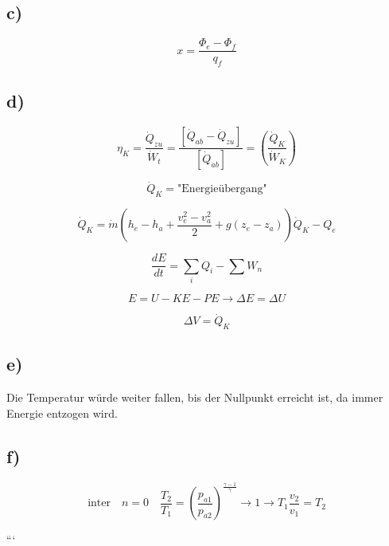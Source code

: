 \subsection*{c)}

\begin{equation*}
    x = \frac{\Phi_e - \Phi_f}{q_f}
\end{equation*}

\subsection*{d)}

\begin{equation*}
    \eta_{K} = \frac{\dot{Q}_{zu}}{\dot{W}_{t}} = \frac{[\dot{Q}_{ab} - \dot{Q}_{zu}]}{[\dot{Q}_{ab}]} = \left( \frac{\dot{Q}_K}{\dot{W}_K} \right)
\end{equation*}

\begin{equation*}
    \dot{Q}_K = \text{"Energieübergang"}
\end{equation*}

\begin{equation*}
    \dot{Q}_K = \dot{m} (h_e - h_a + \frac{v_e^2 - v_a^2}{2} + g(z_e - z_a)) \dot{Q}_K - Q_e
\end{equation*}

\begin{equation*}
    \frac{dE}{dt} = \sum_i Q_i - \sum W_n
\end{equation*}

\begin{equation*}
    E = U - KE - PE \rightarrow \Delta E = \Delta U
\end{equation*}

\begin{equation*}
    \Delta V = \dot{Q}_K
\end{equation*}

\subsection*{e)}

Die Temperatur würde weiter fallen, bis der Nullpunkt erreicht ist, da immer Energie entzogen wird.

\subsection*{f)}

\begin{equation*}
    \text{inter} \quad n = 0 \quad \frac{T_2}{T_1} = \left( \frac{p_{a1}}{p_{a2}} \right)^{\frac{\gamma - 1}{\gamma}} \rightarrow 1 \rightarrow T_1 \frac{v_2}{v_1} = T_2
\end{equation*}

```